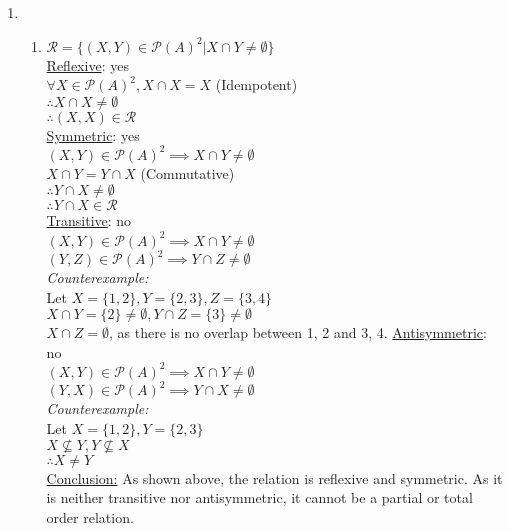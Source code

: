 \documentclass{article}
\theoremstyle{definition}
\begin{document}
\begin{enumerate}[label = \alph*)]
    \item
    \begin{enumerate}
        \item 
        $\mathcal{R} = \{(X, Y) \in \mathcal{P}(A)^2 | X \cap Y \neq \emptyset\}$\\
        \underline{Reflexive}: yes\\
            $\forall X \in \mathcal{P}(A)^2, X \cap X = X$     (Idempotent)\\
            $\therefore X \cap X \neq \emptyset$ \\
            $\therefore (X,X) \in \mathcal{R}$\\
        \underline{Symmetric}: yes\\
            $(X, Y) \in \mathcal{P}(A)^2 \implies X\cap Y \neq \emptyset$\\
            $X\cap Y = Y\cap X$ (Commutative)\\
            $\therefore Y\cap X \neq \emptyset$\\
            $\therefore Y\cap X \in \mathcal{R}$\\
        \underline{Transitive}: no\\
            $(X,Y)\in \mathcal{P}(A)^2 \implies X\cap Y \neq \emptyset$\\
            $(Y,Z)\in \mathcal{P}(A)^2 \implies Y\cap Z \neq \emptyset$\\
            \textit{Counterexample:}\\
                Let $X=\{1, 2\}, Y = \{2, 3\}, Z = \{3, 4\}$\\
                $X\cap Y = \{2\} \neq \emptyset, Y\cap Z = \{3\} \neq \emptyset$\\
                $X\cap Z = \emptyset$, as there is no overlap between {1, 2} and {3, 4}.
        \underline{Antisymmetric}: no\\
            $(X,Y)\in \mathcal{P}(A)^2 \implies X\cap Y \neq \emptyset$\\
            $(Y,X) \in \mathcal{P}(A)^2 \implies Y\cap X\neq 
            \emptyset$\\
            \textit{Counterexample:}\\
                Let $X = \{1, 2\}, Y = \{2, 3\}$\\
                $X\nsubseteq Y, Y \nsubseteq X$\\
                $\therefore X\neq Y$\\
        \underline{Conclusion:} As shown above, the relation is reflexive and symmetric. As it is neither transitive nor antisymmetric, it cannot be a partial or total order relation.
        

\end{enumerate}
\end{enumerate}
\end{document}
